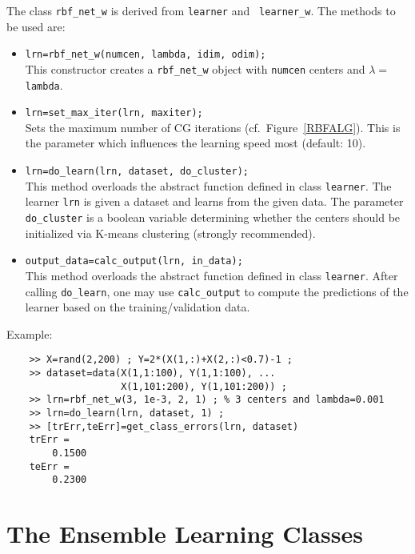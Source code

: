 \documentclass{article}
\begin{document}
The class {\tt rbf\_net\_w} is derived from {\tt learner} and {\tt
  learner\_w}. The methods to be used are:
\begin{itemize}
\item {\tt lrn=rbf\_net\_w(numcen, lambda, idim, odim);}\\
  This constructor creates a {\tt rbf\_net\_w} object with {\tt numcen} centers
  and $\lambda=${\tt lambda}.
\item {\tt lrn=set\_max\_iter(lrn, maxiter);}\\
  Sets the maximum number of CG iterations (cf.~Figure~\ref{RBFALG}). This is
  the parameter which influences the learning speed most (default: 10).
\item {\tt lrn=do\_learn(lrn, dataset, do\_cluster);}\\
  This method overloads the abstract function defined in class {\tt learner}.
  The learner {\tt lrn} is given a dataset and learns from the given data. The
  parameter {\tt do\_cluster} is a boolean variable determining whether the
  centers should be initialized via K-means clustering (strongly recommended).
\item {\tt output\_data=calc\_output(lrn, in\_data);}\\
  This method overloads the abstract function defined in class {\tt learner}.
  After calling {\tt do\_learn}, one may use {\tt calc\_output} to compute the
  predictions of the learner based on the training/validation data.
\end{itemize}
Example:
\begin{verbatim}
    >> X=rand(2,200) ; Y=2*(X(1,:)+X(2,:)<0.7)-1 ;
    >> dataset=data(X(1,1:100), Y(1,1:100), ...
                    X(1,101:200), Y(1,101:200)) ;
    >> lrn=rbf_net_w(3, 1e-3, 2, 1) ; % 3 centers and lambda=0.001
    >> lrn=do_learn(lrn, dataset, 1) ;
    >> [trErr,teErr]=get_class_errors(lrn, dataset) 
    trErr =
        0.1500
    teErr =
        0.2300
\end{verbatim}

\section{The Ensemble Learning Classes}
\end{document}
